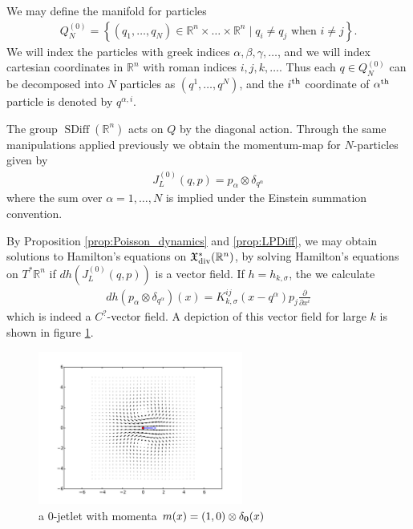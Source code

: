 \documentclass[12pt]{amsart}
\newcommand{\pder}[2]{\ensuremath{\frac{\partial #1}{\partial #2}}}
\newcommand{\R}{\ensuremath{\mathbb{R}}}
\DeclareMathOperator{\SDiff}{SDiff}
\begin{document}
We may define the manifold for particles
\begin{align*}
  Q_N^{(0)} = \left\{ (q_1,\dots,q_N) \in \R^n \times \dots\times \R^n \mid q_i \neq q_j \text{ when } i \neq j \right\}.
\end{align*}
We will index the particles with greek indices $\alpha,\beta,\gamma,\dots$, and we will index cartesian coordinates in $\R^n$ with roman indices $i,j,k,\dots$.
Thus each $q \in Q_N^{(0)}$ can be decomposed into $N$ particles as $(q^1,\dots,q^N)$, and the $i^{\rm th}$ coordinate of $\alpha^{\rm th}$ particle is denoted by $q^{\alpha,i}$.

The group $\SDiff(\R^n)$ acts on $Q$ by the diagonal action.
Through the same manipulations applied previously we obtain the
momentum-map for $N$-particles given by
\begin{align*}
  J_L^{(0)}(q,p) = p_{\alpha} \otimes \delta_{q^\alpha}
\end{align*}
where the sum over $\alpha = 1,\dots,N$ is implied under
the Einstein summation convention.

By Proposition \ref{prop:Poisson_dynamics} and \ref{prop:LPDiff},
we may obtain solutions to Hamilton's equations
on $\mathfrak{X}^*_{\rm div}(\R^n)$, by solving
Hamilton's equations on $T^*\R^n$ if $dh( J_L^{(0)}(q,p) )$ is
a vector field.  If $h = h_{k,\sigma}$, the we calculate
\begin{align*}
	dh( p_\alpha \otimes \delta_{q^\alpha} )  (x) = K_{k,\sigma}^{ij}(x - q^\alpha) p_j \pder{}{x^i}
\end{align*}
which is indeed a $C^?$-vector field.
A depiction of this vector field for large $k$ is shown in figure \ref{fig:zero_jetlet}.

\begin{figure}
	\centering
	\includegraphics[width = 0.6\textwidth]{./images/zero_jet}
	\caption{a $0$-jetlet with momenta $m(x) = (1,0) \otimes \delta_{\bf 0}(x)$}
	\label{fig:zero_jetlet}
\end{figure}
\end{document}
